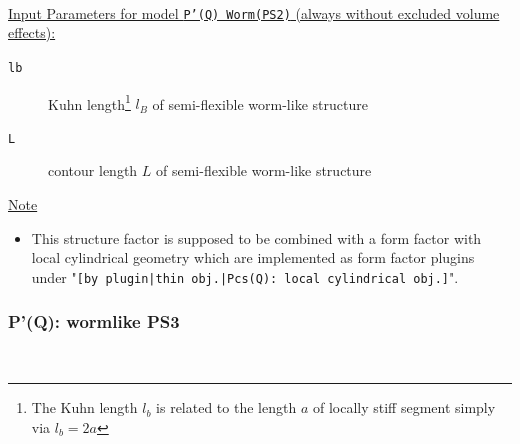 \hspace{1pt}\\
\underline{Input Parameters for model \texttt{P'(Q) Worm(PS2)} (always without excluded volume effects):}\\
\begin{description}
\item[\texttt{lb}] Kuhn length\footnote{The Kuhn length $l_b$ is related to the length $a$ of
    locally stiff segment simply via $l_b=2a$} $l_B$ of semi-flexible worm-like structure
\item[\texttt{L}] contour length $L$ of semi-flexible worm-like structure
\end{description}

\noindent
\underline{Note}
\begin{itemize}
  \item This structure factor is supposed to be combined with a form factor with local cylindrical geometry which are implemented as form factor plugins
under "\texttt{[by plugin|thin obj.|Pcs(Q): local cylindrical obj.]}".
\end{itemize}


\clearpage
\subsubsection{P'(Q): wormlike PS3} ~\\
\label{plugin:Pprime4wormPS3}

